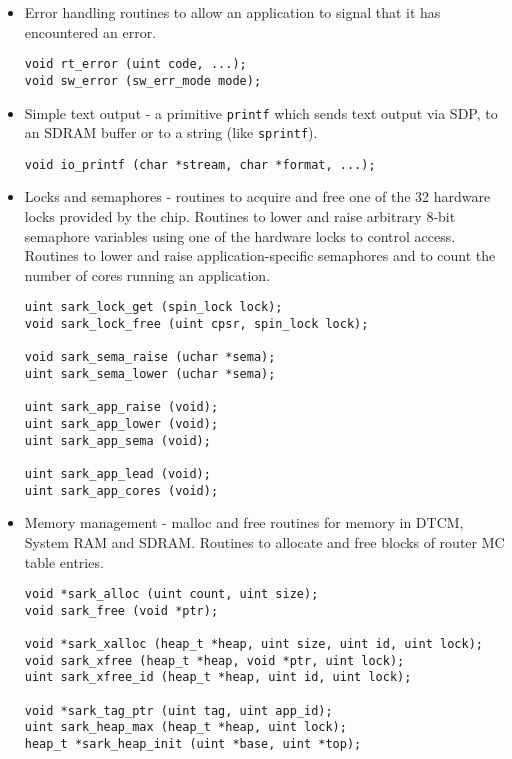 \begin{itemize}
\item
Error handling routines to allow an application to signal that it has
encountered an error.

\lstset{language=C}
\begin{lstlisting}
void rt_error (uint code, ...);
void sw_error (sw_err_mode mode);
\end{lstlisting}

\item
Simple text output - a primitive \texttt{printf} which sends text
output via SDP, to an SDRAM buffer or to a string
(like \texttt{sprintf}).

\lstset{language=C}
\begin{lstlisting}
void io_printf (char *stream, char *format, ...);
\end{lstlisting}

\item
Locks and semaphores - routines to acquire and free one of the
32 hardware locks provided by the chip. Routines to lower and
raise arbitrary 8-bit semaphore variables using one of the
hardware locks to control access. Routines to lower and raise
application-specific semaphores and to count the number of cores
running an application.

\lstset{language=C}
\begin{lstlisting}
uint sark_lock_get (spin_lock lock);
void sark_lock_free (uint cpsr, spin_lock lock);

void sark_sema_raise (uchar *sema);
uint sark_sema_lower (uchar *sema);

uint sark_app_raise (void);
uint sark_app_lower (void);
uint sark_app_sema (void);

uint sark_app_lead (void);
uint sark_app_cores (void);
\end{lstlisting}

\item
Memory management - malloc and free routines for memory in DTCM,
System RAM and SDRAM. Routines to allocate and free blocks of router
MC table entries.

\lstset{language=C}
\begin{lstlisting}
void *sark_alloc (uint count, uint size);
void sark_free (void *ptr);

void *sark_xalloc (heap_t *heap, uint size, uint id, uint lock);
void sark_xfree (heap_t *heap, void *ptr, uint lock);
uint sark_xfree_id (heap_t *heap, uint id, uint lock);

void *sark_tag_ptr (uint tag, uint app_id);
uint sark_heap_max (heap_t *heap, uint lock);
heap_t *sark_heap_init (uint *base, uint *top);


\end{lstlisting}
\end{itemize}
